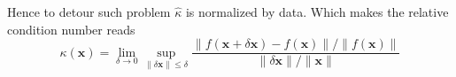 \documentclass[../main.tex]{subfiles}
\begin{document}
		Hence to detour such problem $\hat{\kappa}$ is normalized by data. Which makes the relative condition number reads
		\begin{equation*}
			\kappa(\mathbf{x}) = \lim_{\delta \rightarrow 0} \sup_{\| \delta \mathbf{x} \| \leq \delta}  \frac{\|  f(\mathbf{x} + \delta \mathbf{x}) - f(\mathbf{x}) \| \bigg/ \| f(\mathbf{x}) \|}{\| \delta \mathbf{x} \| \bigg/ \| \mathbf{x} \|}
		\end{equation*}
		
\end{document}
